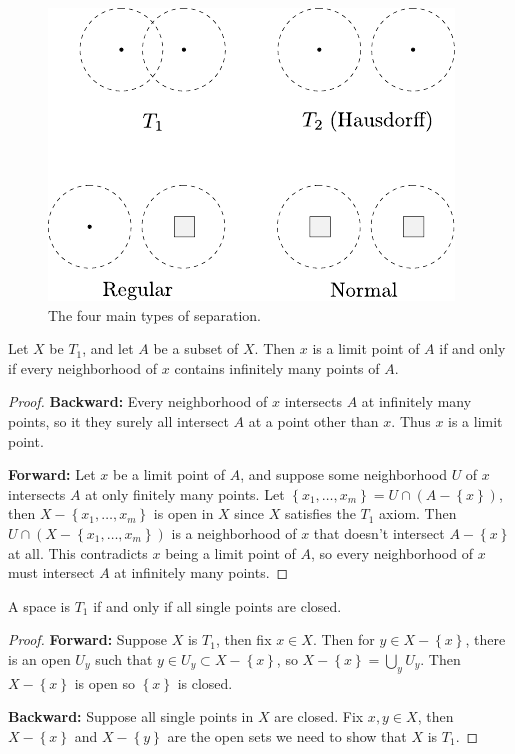 \documentclass[10pt]{report}
\begin{document}
\begin{figure}[H]
	\centering
	\includegraphics[scale=1]{fig/separation.pdf}
	\caption{The four main types of separation.}
\end{figure}

\begin{prop}
	Let $X$ be $T_1$, and let $A$ be a subset of $X$. Then $x$ is a limit point of $A$ if and only if every neighborhood of $x$ contains infinitely many points of $A$.
\end{prop}
\begin{proof}
	\textbf{Backward:} Every neighborhood of $x$ intersects $A$ at infinitely many points, so it they surely all intersect $A$ at a point other than $x$. Thus $x$ is a limit point.

	\textbf{Forward:} Let $x$ be a limit point of $A$, and suppose some neighborhood $U$ of $x$ intersects $A$ at only finitely many points. Let $\left\{ x_1,\dots,x_m \right\} = U \cap (A-\left\{ x \right\})$, then $X - \left\{ x_1,\dots,x_m \right\}$ is open in $X$ since $X$ satisfies the $T_1$ axiom. Then $U \cap (X - \left\{ x_1,\dots,x_m \right\})$ is a neighborhood of $x$ that doesn't intersect $A - \left\{ x \right\}$ at all. This contradicts $x$ being a limit point of $A$, so every neighborhood of $x$ must intersect $A$ at infinitely many points.
\end{proof}

\begin{prop}
	A space is $T_1$ if and only if all single points are closed.
\end{prop}
\begin{proof}
	\textbf{Forward:} Suppose $X$ is $T_1$, then fix $x \in X$. Then for $y \in X- \left\{ x \right\}$, there is an open $U_{y}$ such that $y \in U_y \subset X - \left\{ x \right\}$, so $X - \left\{ x \right\} = \bigcup_{y}U_y$. Then $X-\left\{ x \right\}$ is open so $\left\{ x \right\}$ is closed.

	\textbf{Backward:} Suppose all single points in $X$ are closed. Fix $x,y \in X$, then $X-\left\{ x \right\}$ and $X-\left\{ y \right\}$ are the open sets we need to show that $X$ is $T_1$.
\end{proof}
\end{document}
